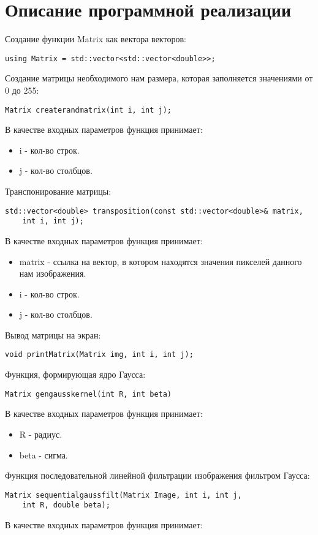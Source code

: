 \documentclass{report}
\begin{document}
\section*{Описание программной реализации}
Создание функции Matrix как вектора векторов:
\begin{lstlisting}
using Matrix = std::vector<std::vector<double>>;
\end{lstlisting}
Создание матрицы необходимого нам размера, которая заполняется значениями от 0 до 255:
\begin{lstlisting}
Matrix createrandmatrix(int i, int j);
\end{lstlisting}
В качестве входных параметров функция принимает:
\begin{itemize}
\item i - кол-во строк.
\item j - кол-во столбцов.
\end{itemize}
Транспонирование матрицы:
\begin{lstlisting}
std::vector<double> transposition(const std::vector<double>& matrix,
    int i, int j);
\end{lstlisting}
В качестве входных параметров функция принимает:
\begin{itemize}
\item matrix - ссылка на вектор, в котором находятся значения пикселей данного нам изображения.
\item i - кол-во строк.
\item j - кол-во столбцов.
\end{itemize}
Вывод матрицы на экран:
\begin{lstlisting}
void printMatrix(Matrix img, int i, int j);
\end{lstlisting}
Функция, формирующая ядро Гаусса:
\begin{lstlisting}
Matrix gengausskernel(int R, int beta)
\end{lstlisting}
В качестве входных параметров функция принимает:
\begin{itemize}
\item R - радиус.
\item beta - сигма.
\end{itemize}
Функция последовательной линейной фильтрации изображения фильтром Гаусса:
\begin{lstlisting}
Matrix sequentialgaussfilt(Matrix Image, int i, int j,
    int R, double beta);
\end{lstlisting}
В качестве входных параметров функция принимает:
\end{document}
